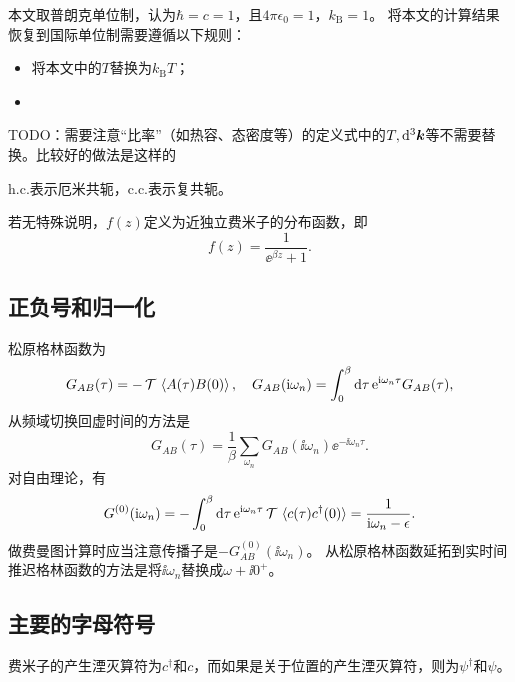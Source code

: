 本文取普朗克单位制，认为$\hbar=c=1$，且$4\pi\epsilon_0=1$，$k_\text{B}=1$。
将本文的计算结果恢复到国际单位制需要遵循以下规则：
\begin{itemize}
    \item 将本文中的$T$替换为$k_\text{B} T$；
    \item 
\end{itemize}
TODO：需要注意“比率”（如热容、态密度等）的定义式中的$T, \dd[3]{\vb*{k}}$等不需要替换。比较好的做法是这样的

$\text{h.c.}$表示厄米共轭，$\text{c.c.}$表示复共轭。

若无特殊说明，$f(z)$定义为近独立费米子的分布函数，即
\[
    f(z) = \frac{1}{\ee^{\beta z} + 1}.
\]

\subsection*{正负号和归一化}

松原格林函数为
\begin{equation}
    G_{AB}(\tau) = - \operatorname{\mathcal{T}} \expval*{A(\tau) B(0)}, \quad G_{AB}(\mathrm{i} \omega_n) = \int_0^\beta \dd{\tau} \mathrm{e}^{\mathrm{i} \omega_n \tau} G_{AB}(\tau),
\end{equation}
从频域切换回虚时间的方法是
\begin{equation}
    G_{AB}(\tau) = \frac{1}{\beta} \sum_{\omega_n} G_{AB}(\ii \omega_n) \ee^{- \ii \omega_n \tau}.
\end{equation}
对自由理论，有
\begin{equation}
    G^{(0)}(\mathrm{i} \omega_n) = - \int_0^\beta \dd{\tau} \mathrm{e}^{\mathrm{i} \omega_n \tau} \operatorname{\mathcal{T}} \expval*{c(\tau) c^\dagger(0)} = \frac{1}{\mathrm{i} \omega_n - \epsilon}.
\end{equation}
做费曼图计算时应当注意传播子是$-G^{(0)}_{AB}(\ii \omega_n)$。
从松原格林函数延拓到实时间推迟格林函数的方法是将$\ii \omega_n$替换成$\omega + \ii 0^+$。

\subsection*{主要的字母符号}

费米子的产生湮灭算符为${c}^\dagger$和${c}$，而如果是关于位置的产生湮灭算符，则为${\psi}^\dagger$和${\psi}$。
